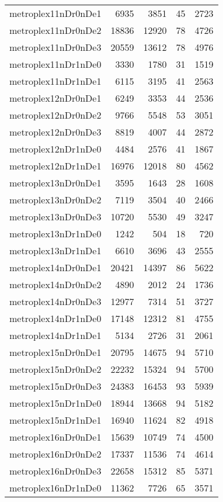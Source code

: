 \begin{tabular}{lrrrr}
metroplex11nDr0nDe1 & 6935 & 3851 & 45 & 2723 \\
metroplex11nDr0nDe2 & 18836 & 12920 & 78 & 4726 \\
metroplex11nDr0nDe3 & 20559 & 13612 & 78 & 4976 \\
metroplex11nDr1nDe0 & 3330 & 1780 & 31 & 1519 \\
metroplex11nDr1nDe1 & 6115 & 3195 & 41 & 2563 \\
metroplex12nDr0nDe1 & 6249 & 3353 & 44 & 2536 \\
metroplex12nDr0nDe2 & 9766 & 5548 & 53 & 3051 \\
metroplex12nDr0nDe3 & 8819 & 4007 & 44 & 2872 \\
metroplex12nDr1nDe0 & 4484 & 2576 & 41 & 1867 \\
metroplex12nDr1nDe1 & 16976 & 12018 & 80 & 4562 \\
metroplex13nDr0nDe1 & 3595 & 1643 & 28 & 1608 \\
metroplex13nDr0nDe2 & 7119 & 3504 & 40 & 2466 \\
metroplex13nDr0nDe3 & 10720 & 5530 & 49 & 3247 \\
metroplex13nDr1nDe0 & 1242 & 504 & 18 & 720 \\
metroplex13nDr1nDe1 & 6610 & 3696 & 43 & 2555 \\
metroplex14nDr0nDe1 & 20421 & 14397 & 86 & 5622 \\
metroplex14nDr0nDe2 & 4890 & 2012 & 24 & 1736 \\
metroplex14nDr0nDe3 & 12977 & 7314 & 51 & 3727 \\
metroplex14nDr1nDe0 & 17148 & 12312 & 81 & 4755 \\
metroplex14nDr1nDe1 & 5134 & 2726 & 31 & 2061 \\
metroplex15nDr0nDe1 & 20795 & 14675 & 94 & 5710 \\
metroplex15nDr0nDe2 & 22232 & 15324 & 94 & 5700 \\
metroplex15nDr0nDe3 & 24383 & 16453 & 93 & 5939 \\
metroplex15nDr1nDe0 & 18944 & 13668 & 94 & 5182 \\
metroplex15nDr1nDe1 & 16940 & 11624 & 82 & 4918 \\
metroplex16nDr0nDe1 & 15639 & 10749 & 74 & 4500 \\
metroplex16nDr0nDe2 & 17337 & 11536 & 74 & 4614 \\
metroplex16nDr0nDe3 & 22658 & 15312 & 85 & 5371 \\
metroplex16nDr1nDe0 & 11362 & 7726 & 65 & 3571 \\

\end{tabular}
